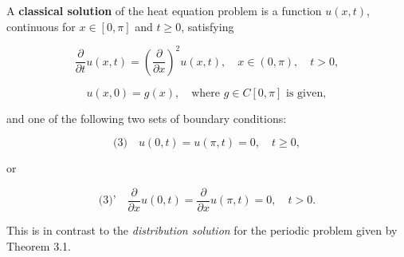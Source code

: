 A \textbf{classical solution} of the heat equation problem is a function $u(x, t)$, continuous for $x \in [0, \pi]$ and $t \geq 0$, satisfying

$$\frac{\partial}{\partial t} u(x, t) = \left( \frac{\partial}{\partial x} \right)^2 u(x, t), \quad x \in (0, \pi), \quad t > 0,$$

$$u(x, 0) = g(x), \quad \text{where } g \in C[0, \pi] \text{ is given},$$

and one of the following two sets of boundary conditions:

$$\text{(3)} \quad u(0, t) = u(\pi, t) = 0, \quad t \geq 0,$$

or

$$\text{(3)'} \quad \frac{\partial}{\partial x} u(0, t) = \frac{\partial}{\partial x} u(\pi, t) = 0, \quad t > 0.$$

This is in contrast to the \textit{distribution solution} for the periodic problem given by Theorem 3.1.
